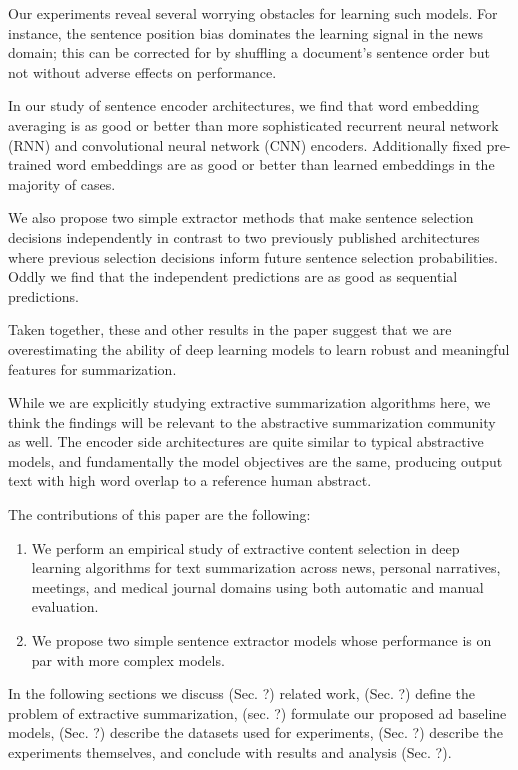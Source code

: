 Our experiments reveal several worrying obstacles for learning such models. 
For instance, the sentence position bias dominates the learning signal in the 
news domain; this can be corrected for by shuffling a document's sentence
order but not without adverse effects on performance.

In our study of sentence encoder architectures, we find that word embedding
averaging is as good or better than more sophisticated recurrent neural 
network (RNN) and convolutional neural network (CNN) encoders.
Additionally fixed pre-trained word embeddings are as good or better than 
learned embeddings in the majority of cases. 

We also propose two simple extractor methods that make sentence selection
decisions independently in contrast to two previously published architectures
where previous selection decisions inform future sentence selection probabilities. 
Oddly we find that the independent predictions are as good as sequential 
predictions.

Taken together, these and other results in the paper suggest that we are 
overestimating the ability of deep learning models to learn robust and 
meaningful features for summarization. 



While we are explicitly studying extractive summarization algorithms here,
we think the findings will be relevant to the abstractive summarization 
community as well. The encoder side architectures are quite similar to
typical abstractive models, and fundamentally the model objectives are 
the same, producing output text with high word overlap to a reference human
abstract. 

The contributions of this paper are the following:
\begin{enumerate}
    \item We perform an empirical study of extractive content selection in 
        deep learning 
        algorithms for text summarization across news, personal narratives, 
         meetings, and
         medical journal domains using both automatic and manual evaluation.
    \item We propose two simple sentence extractor models whose performance is 
          on par 
          with more complex models.
\end{enumerate}
In the following sections we discuss 
(Sec. ?) related work, 
(Sec. ?) define the problem of extractive summarization, 
(sec. ?) formulate our proposed ad baseline models,
(Sec. ?) describe the datasets used for experiments,
(Sec. ?) describe the experiments themselves, and conclude with 
results and analysis (Sec. ?).



